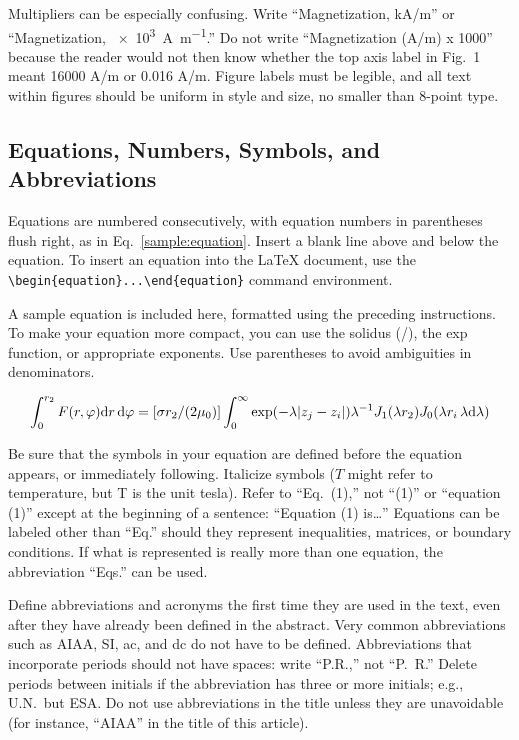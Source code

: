 \documentclass[conf]{new-aiaa}
\begin{document}
Multipliers can be especially confusing. Write ``Magnetization, \si[per-mode=symbol]{\kilo\ampere\per\meter}'' or ``Magnetization, \SI[per-mode=symbol]{e3}{\ampere\per\meter}.'' Do not write ``Magnetization (A/m) x 1000'' because the reader would not then know whether the top axis label in Fig.~1 meant 16000 A/m or 0.016 A/m. Figure labels must be legible, and all text within figures should be uniform in style and size, no smaller than 8-point type.

\subsection{Equations, Numbers, Symbols, and Abbreviations}
Equations are numbered consecutively, with equation numbers in parentheses flush right, as in Eq.~\eqref{sample:equation}. Insert a blank line above and below the equation. To insert an equation into the \LaTeX{} document, use the \verb|\begin{equation}...\end{equation}| command environment.

A sample equation is included here, formatted using the preceding instructions. To make your equation more compact, you can use the solidus (/), the exp function, or appropriate exponents. Use parentheses to avoid ambiguities in denominators.

\begin{equation}
\label{sample:equation}
\int^{r_2}_0 F(r,\varphi){\rm d}r\,{\rm d}\varphi = [\sigma r_2/(2\mu_0)]\int^{\infty}_0\exp(-\lambda|z_j-z_i|)\lambda^{-1}J_1 (\lambda r_2)J_0 (\lambda r_i\,\lambda {\rm d}\lambda)
\end{equation}

Be sure that the symbols in your equation are defined before the equation appears, or immediately following. Italicize symbols ($T$ might refer to temperature, but T is the unit tesla). Refer to ``Eq.~(1),'' not ``(1)'' or ``equation (1)'' except at the beginning of a sentence: ``Equation (1) is\ldots'' Equations can be labeled other than ``Eq.'' should they represent inequalities, matrices, or boundary conditions. If what is represented is really more than one equation, the abbreviation ``Eqs.'' can be used.

Define abbreviations and acronyms the first time they are used in the text, even after they have already been defined in the abstract. Very common abbreviations such as AIAA, SI, ac, and dc do not have to be defined. Abbreviations that incorporate periods should not have spaces: write ``P.R.,'' not ``P.~R.'' Delete periods between initials if the abbreviation has three or more initials; e.g., U.N.~but ESA. Do not use abbreviations in the title unless they are unavoidable (for instance, ``AIAA'' in the title of this article).
\end{document}
